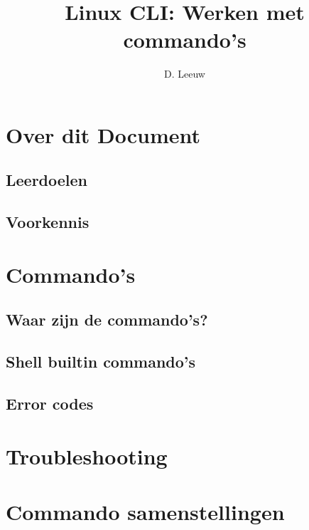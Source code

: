 \documentclass[a4paper,12pt,twoside,openright,titlepage]{article}
\author{D. Leeuw}
\title{Linux CLI: Werken met commando's}
\date{\today\\
\vfill
\raggedright
\copyright\ 2020-2025 Dennis Leeuw\\
}
\begin{document}

\maketitle


\section{Over dit Document}
\subsection{Leerdoelen}

\subsection{Voorkennis}



\section{Commando's}

\subsection{Waar zijn de commando's?}


\subsection{Shell builtin commando's}

\subsection{Error codes}


\section{Troubleshooting}


\section{Commando samenstellingen}

\end{document}
